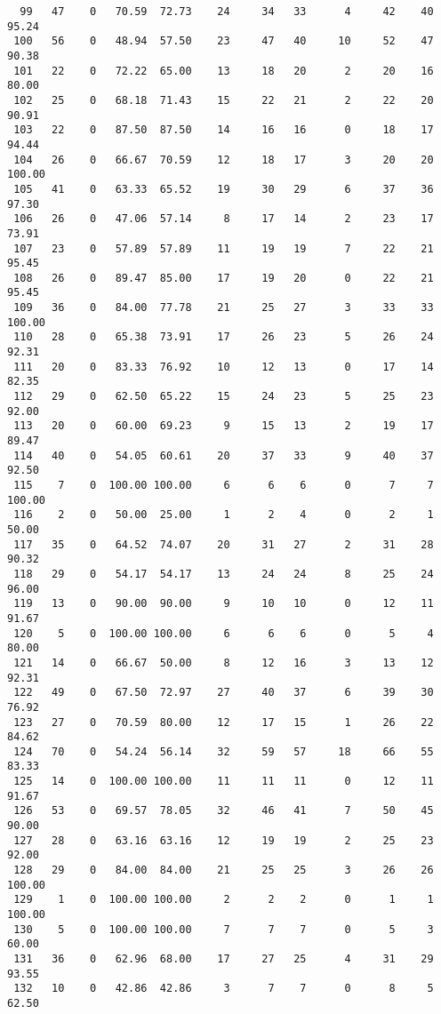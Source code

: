 \begin{verbatim}
  99   47    0   70.59  72.73    24     34   33      4     42    40    95.24
 100   56    0   48.94  57.50    23     47   40     10     52    47    90.38
 101   22    0   72.22  65.00    13     18   20      2     20    16    80.00
 102   25    0   68.18  71.43    15     22   21      2     22    20    90.91
 103   22    0   87.50  87.50    14     16   16      0     18    17    94.44
 104   26    0   66.67  70.59    12     18   17      3     20    20   100.00
 105   41    0   63.33  65.52    19     30   29      6     37    36    97.30
 106   26    0   47.06  57.14     8     17   14      2     23    17    73.91
 107   23    0   57.89  57.89    11     19   19      7     22    21    95.45
 108   26    0   89.47  85.00    17     19   20      0     22    21    95.45
 109   36    0   84.00  77.78    21     25   27      3     33    33   100.00
 110   28    0   65.38  73.91    17     26   23      5     26    24    92.31
 111   20    0   83.33  76.92    10     12   13      0     17    14    82.35
 112   29    0   62.50  65.22    15     24   23      5     25    23    92.00
 113   20    0   60.00  69.23     9     15   13      2     19    17    89.47
 114   40    0   54.05  60.61    20     37   33      9     40    37    92.50
 115    7    0  100.00 100.00     6      6    6      0      7     7   100.00
 116    2    0   50.00  25.00     1      2    4      0      2     1    50.00
 117   35    0   64.52  74.07    20     31   27      2     31    28    90.32
 118   29    0   54.17  54.17    13     24   24      8     25    24    96.00
 119   13    0   90.00  90.00     9     10   10      0     12    11    91.67
 120    5    0  100.00 100.00     6      6    6      0      5     4    80.00
 121   14    0   66.67  50.00     8     12   16      3     13    12    92.31
 122   49    0   67.50  72.97    27     40   37      6     39    30    76.92
 123   27    0   70.59  80.00    12     17   15      1     26    22    84.62
 124   70    0   54.24  56.14    32     59   57     18     66    55    83.33
 125   14    0  100.00 100.00    11     11   11      0     12    11    91.67
 126   53    0   69.57  78.05    32     46   41      7     50    45    90.00
 127   28    0   63.16  63.16    12     19   19      2     25    23    92.00
 128   29    0   84.00  84.00    21     25   25      3     26    26   100.00
 129    1    0  100.00 100.00     2      2    2      0      1     1   100.00
 130    5    0  100.00 100.00     7      7    7      0      5     3    60.00
 131   36    0   62.96  68.00    17     27   25      4     31    29    93.55
 132   10    0   42.86  42.86     3      7    7      0      8     5    62.50

\end{verbatim}
